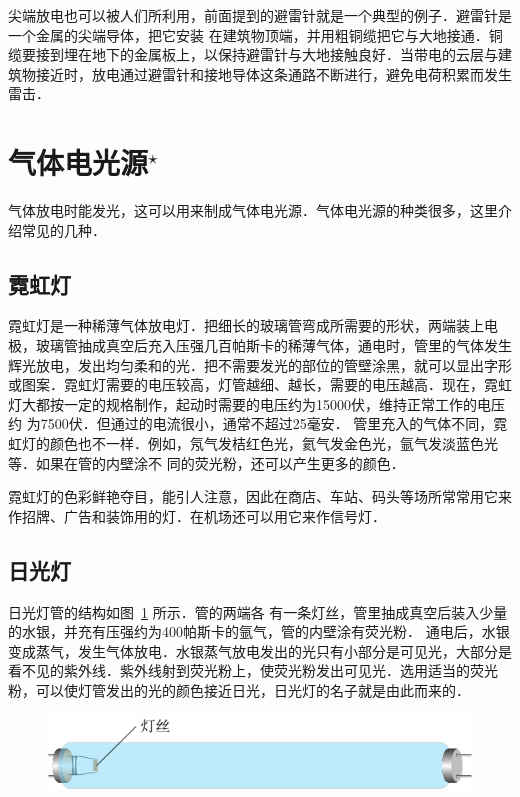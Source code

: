 尖端放电也可以被人们所利用，前面提到的避雷针就是一个典型的例子．避雷针是一个金属的尖端导体，把它安装
在建筑物顶端，并用粗铜缆把它与大地接通．铜缆要接到埋在地下的金属板上，以保持避雷针与大地接触良好．当带电的云层与建筑物接近时，放电通过避雷针和接地导体这条通路不断进行，避免电荷积累而发生雷击．

\section{气体电光源$^\star$}

气体放电时能发光，这可以用来制成气体电光源．气体电光源的种类很多，这里介绍常见的几种．

\subsection{霓虹灯}


霓虹灯是一种稀薄气体放电灯．把细长的玻璃管弯成所需要的形状，两端装上电极，玻璃管抽成真空后充入压强几百帕斯卡的稀薄气体，通电时，管里的气体发生辉光放电，发出均匀柔和的光．把不需要发光的部位的管壁涂黑，就可以显出字形或图案．霓虹灯需要的电压较高，灯管越细、越长，需要的电压越高．现在，霓虹灯大都按一定的规格制作，起动时需要的电压约为15000伏，维持正常工作的电压约
为7500伏．但通过的电流很小，通常不超过25毫安．
管里充入的气体不同，霓虹灯的颜色也不一样．例如，氖气发桔红色光，氦气发金色光，氩气发淡蓝色光等．如果在管的内壁涂不
同的荧光粉，还可以产生更多的颜色．

霓虹灯的色彩鲜艳夺目，能引人注意，因此在商店、车站、码头等场所常常用它来作招牌、广告和装饰用的灯．在机场还可以用它来作信号灯．

\subsection{日光灯}
日光灯管的结构如图~\ref{fig_B_8-12} 所示．管的两端各
有一条灯丝，管里抽成真空后装入少量的水银，并充有压强约为400帕斯卡的氩气，管的内壁涂有荧光粉．
通电后，水银变成蒸气，发生气体放电．水银蒸气放电发出的光只有小部分是可见光，大部分是看不见的紫外线．紫外线射到荧光粉上，使荧光粉发出可见光．选用适当的荧光粉，可以使灯管发出的光的颜色接近日光，日光灯的名子就是由此而来的．
\begin{figure}[htbp]
    \centering
    \includegraphics{fig/B/8-12.pdf}
    \caption{}\label{fig_B_8-12}
\end{figure}

